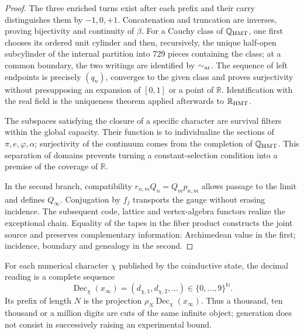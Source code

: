 \begin{proof}
The three enriched turns exist after each prefix and their carry
distinguishes them by \(-1,0,+1\). Concatenation and truncation are
inverses, proving bijectivity and continuity of \(\beta\). For a
Cauchy class of \(\mathbb Q_{\rm HMT}\), one first chooses its ordered unit
cylinder and then, recursively, the unique half-open subcylinder
of the internal partition into \(729\) pieces containing the class; at a
common boundary, the two writings are identified by \(\sim_{\rm ar}\).
The sequence of left endpoints is precisely \((q_n)\), converges to the
given class and proves surjectivity without presupposing an expansion of
\([0,1]\) or a point of \(\mathbb R\). Identification with the real field
is the uniqueness theorem applied afterwards to \(\mathbb R_{\rm HMT}\).

The subspaces satisfying the closure of a specific character are survival
filters within the global capacity. Their function is to individualize
the sections of \(\pi,e,\varphi,\alpha\); surjectivity of the continuum
comes from the completion of \(\mathbb Q_{\rm HMT}\). This separation of
domains prevents
turning a constant-selection condition into a premise of the
coverage of \(\mathbb R\).

In the second branch, compatibility
\(r_{n,m}Q_n=Q_m p_{n,m}\) allows passage to the limit and defines \(Q_\infty\).
Conjugation by \(f_j\) transports the gauge without erasing incidence.
The subsequent code, lattice and vertex-algebra functors realize
the exceptional chain. Equality of the tapes in the fiber product
constructs the joint source and preserves complementary information: Archimedean
value in the first; incidence, boundary and genealogy in the second.
\end{proof}

\begin{corollary}
\label{cor:c27-expansion-infinita-objeto}
For each numerical character \(\chi\) published by the coinductive state, the
decimal reading is a complete sequence
\[
 \operatorname{Dec}_\chi(x_\infty)
 =(d_{\chi,1},d_{\chi,2},\ldots)
 \in\{0,\ldots,9\}^{\mathbb N}.
\]
Its prefix of length \(N\) is the projection
\(\rho_N\operatorname{Dec}_\chi(x_\infty)\). Thus a thousand, ten thousand or a
million digits are cuts of the same infinite object; generation does not
consist in successively raising an experimental bound.
\end{corollary}

